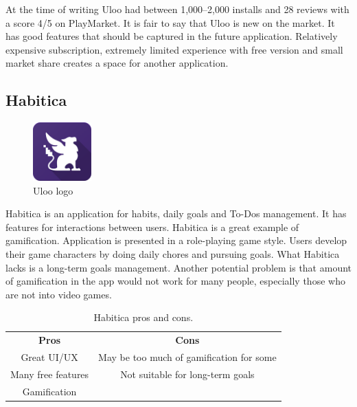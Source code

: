 At the time of writing Uloo had between 1,000--2,000 installs and 28 reviews with a score 4/5 on PlayMarket.
It is fair to say that Uloo is new on the market.
It has good features that should be captured in the future application.
Relatively expensive subscription, extremely limited experience with free version and small market share creates a space for another application.


\subsection{Habitica}\label{subsec:habitica}

\begin{figure}[h!]
    \includegraphics[width=0.20\textwidth]{images/habitica}
    \caption{Uloo logo~\cite{habitica-logo}}
    \label{fig:habitica-logo}
\end{figure}

Habitica is an application for habits, daily goals and To-Dos management.
It has features for interactions between users.
Habitica is a great example of gamification.
Application is presented in a role-playing game style.
Users develop their game characters by doing daily chores and pursuing goals.
What Habitica lacks is a long-term goals management.
Another potential problem is that amount of gamification in the app would not work for many people,
especially those who are not into video games.

\begin{table}[h!]
    \centering
    \begin{ctucolortab}
        \begin{tabular}{cc}
            \bfseries Pros & \bfseries Cons\\\Midrule
            Great UI/UX & May be too much of gamification for some\\
            Many free features & Not suitable for long-term goals\\
            Gamification & \\
        \end{tabular}
    \end{ctucolortab}
    \caption{Habitica pros and cons.}\label{tab:habitica-pros-cons}
\end{table}

